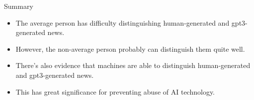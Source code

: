\begin{vbframe}{Summary}

\vfill

  \begin{itemize}
\item The average person has difficulty distinguishing
human-generated and gpt3-generated news.
\item However, the non-average person probably can
distinguish them quite well.
\item There's also evidence that machines
are able to distinguish
human-generated and gpt3-generated news.
\item This has great significance for preventing abuse
of AI technology.
  \end{itemize}

\vfill

\end{vbframe}


\endlecture

